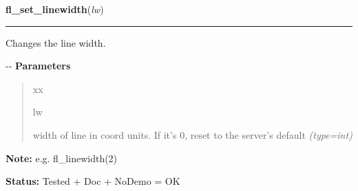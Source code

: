 \hspace{.8\funcindent}\begin{boxedminipage}{\funcwidth}

    \raggedright \textbf{fl\_set\_linewidth}(\textit{lw})

    \vspace{-1.5ex}

    \rule{\textwidth}{0.5\fboxrule}
\setlength{\parskip}{2ex}

Changes the line width.

-{}-
\setlength{\parskip}{1ex}
      \textbf{Parameters}
      \vspace{-1ex}

      \begin{quote}
        \begin{Ventry}{xx}

          \item[lw]


width of line in coord units. If it's 0, reset to the server's
default
            {\it (type=int)}

        \end{Ventry}

      \end{quote}

\textbf{Note:} 
e.g. fl\_linewidth(2)


\textbf{Status:} 
Tested + Doc + NoDemo = OK


    \end{boxedminipage}

    \label{xformslib:flxbasic:fl_linestyle}

    \vspace{0.5ex}

